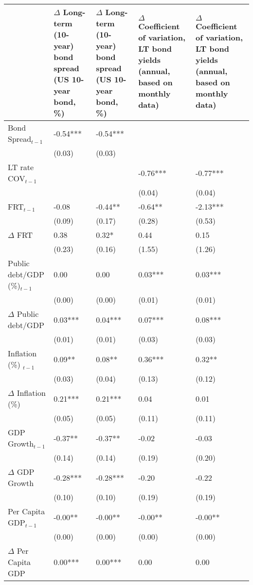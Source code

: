 \begingroup\tiny
\begin{tabular}{lp{3cm}p{3cm}p{3cm}p{3cm}}
  \hline
 & $\Delta$ Long-term (10-year) bond spread (US 10-year bond, \%) & $\Delta$ Long-term (10-year) bond spread (US 10-year bond, \%) & $\Delta$ Coefficient of variation, LT bond yields (annual, based on monthly data) & $\Delta$ Coefficient of variation, LT bond yields (annual, based on monthly data) \\ 
  \hline
Bond Spread$_{t-1}$ & -0.54*** & -0.54*** &  &  \\ 
   & (0.03) & (0.03) &  &  \\ 
  LT rate COV$_{t-1}$ &  &  & -0.76*** & -0.77*** \\ 
   &  &  & (0.04) & (0.04) \\ 
  FRT$_{t-1}$ & -0.08 & -0.44** & -0.64** & -2.13*** \\ 
   & (0.09) & (0.17) & (0.28) & (0.53) \\ 
  $\Delta$ FRT & 0.38 & 0.32* & 0.44 & 0.15 \\ 
   & (0.23) & (0.16) & (1.55) & (1.26) \\ 
  Public debt/GDP (\%)$_{t-1}$ & 0.00 & 0.00 & 0.03*** & 0.03*** \\ 
   & (0.00) & (0.00) & (0.01) & (0.01) \\ 
  $\Delta$ Public debt/GDP & 0.03*** & 0.04*** & 0.07*** & 0.08*** \\ 
   & (0.01) & (0.01) & (0.03) & (0.03) \\ 
  Inflation (\%) $_{t-1}$ & 0.09** & 0.08** & 0.36*** & 0.32** \\ 
   & (0.03) & (0.04) & (0.13) & (0.12) \\ 
  $\Delta$ Inflation (\%) & 0.21*** & 0.21*** & 0.04 & 0.01 \\ 
   & (0.05) & (0.05) & (0.11) & (0.11) \\ 
  GDP Growth$_{t-1}$ & -0.37** & -0.37** & -0.02 & -0.03 \\ 
   & (0.14) & (0.14) & (0.19) & (0.20) \\ 
  $\Delta$ GDP Growth & -0.28*** & -0.28*** & -0.20 & -0.22 \\ 
   & (0.10) & (0.10) & (0.19) & (0.19) \\ 
  Per Capita GDP$_{t-1}$ & -0.00** & -0.00** & -0.00** & -0.00** \\ 
   & (0.00) & (0.00) & (0.00) & (0.00) \\ 
  $\Delta$ Per Capita GDP & 0.00*** & 0.00*** & 0.00 & 0.00 \\ 

\end{tabular}
